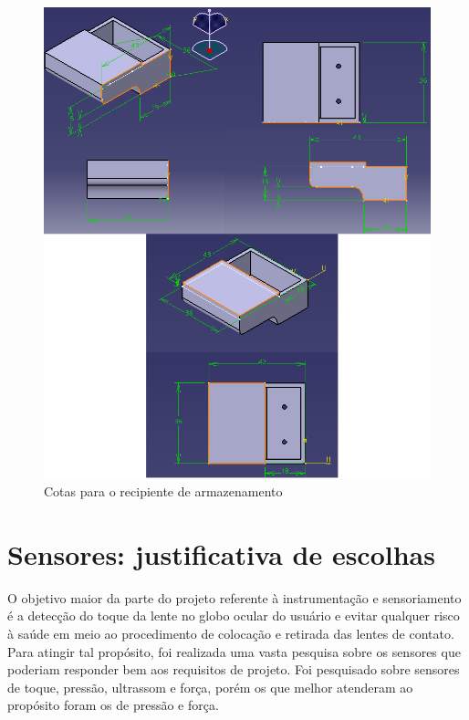 \begin{figure}[htb]
		\centering
			\includegraphics[scale=0.6]{figuras/caixamedidas.png}
		\caption{Cotas para o recipiente de armazenamento}
		\label{caixamedidas}
\end{figure}






\section[Sensores: justificativa de escolhas]{Sensores: justificativa de escolhas}

O objetivo maior da parte do projeto referente à instrumentação e sensoriamento é a detecção do toque da lente no globo ocular do usuário e evitar qualquer risco à saúde em meio ao procedimento de colocação e retirada das lentes de contato. Para atingir tal propósito, foi realizada uma vasta pesquisa sobre os sensores que poderiam responder bem aos requisitos de projeto. Foi pesquisado sobre sensores de toque, pressão, ultrassom e força, porém os que melhor atenderam ao propósito foram os de pressão e força. 

